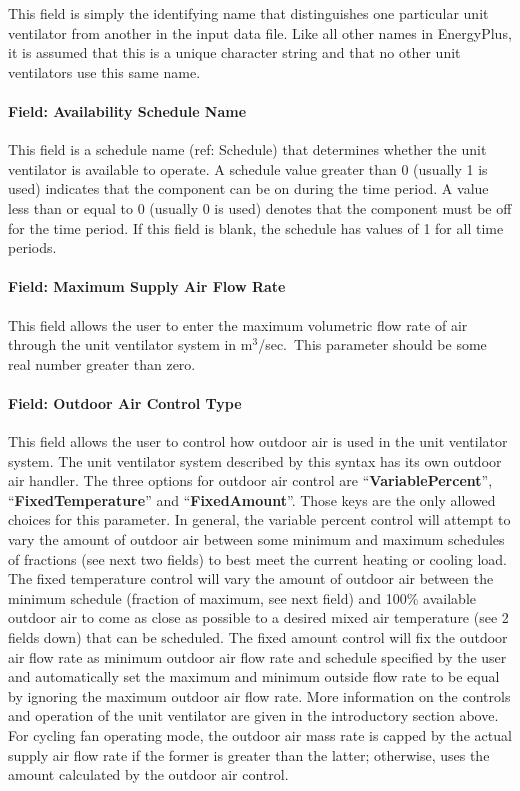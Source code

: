 This field is simply the identifying name that distinguishes one particular unit ventilator from another in the input data file. Like all other names in EnergyPlus, it is assumed that this is a unique character string and that no other unit ventilators use this same name.

\paragraph{Field: Availability Schedule Name}\label{field-availability-schedule-name-2-009}

This field is a schedule name (ref: Schedule) that determines whether the unit ventilator is available to operate. A schedule value greater than 0 (usually 1 is used) indicates that the component can be on during the time period. A value less than or equal to 0 (usually 0 is used) denotes that the component must be off for the time period. If this field is blank, the schedule has values of 1 for all time periods.

\paragraph{Field: Maximum Supply Air Flow Rate}\label{field-maximum-supply-air-flow-rate-1}

This field allows the user to enter the maximum volumetric flow rate of air through the unit ventilator system in m\(^{3}\)/sec.~This parameter should be some real number greater than zero.

\paragraph{Field: Outdoor Air Control Type}\label{field-outdoor-air-control-type-000}

This field allows the user to control how outdoor air is used in the unit ventilator system. The unit ventilator system described by this syntax has its own outdoor air handler. The three options for outdoor air control are ``\textbf{VariablePercent}'', ``\textbf{FixedTemperature}'' and ``\textbf{FixedAmount}''. Those keys are the only allowed choices for this parameter. In general, the variable percent control will attempt to vary the amount of outdoor air between some minimum and maximum schedules of fractions (see next two fields) to best meet the current heating or cooling load. The fixed temperature control will vary the amount of outdoor air between the minimum schedule (fraction of maximum, see next field) and 100\% available outdoor air to come as close as possible to a desired mixed air temperature (see 2 fields down) that can be scheduled. The fixed amount control will fix the outdoor air flow rate as minimum outdoor air flow rate and schedule specified by the user and automatically set the maximum and minimum outside flow rate to be equal by ignoring the maximum outdoor air flow rate. More information on the controls and operation of the unit ventilator are given in the introductory section above. For cycling fan operating mode, the outdoor air mass rate is capped by the actual supply air flow rate if the former is greater than the latter; otherwise, uses the amount calculated by the outdoor air control.

